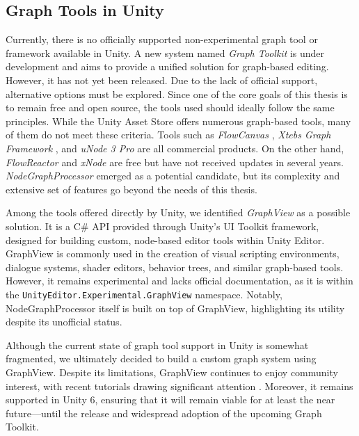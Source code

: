 \subsection{Graph Tools in Unity}
Currently, there is no officially supported non-experimental graph tool or framework available in Unity. A new system named \textit{Graph Toolkit}  \cite{Unity-GraphToolkit} is under development and aims to provide a unified solution for graph-based editing. However, it has not yet been released. Due to the lack of official support, alternative options must be explored. Since one of the core goals of this thesis is to remain free and open source, the tools used should ideally follow the same principles. While the Unity Asset Store offers numerous graph-based tools, many of them do not meet these criteria. Tools such as \textit{FlowCanvas} \cite{FlowCanvas}, \textit{Xtebs Graph Framework} \cite{XtebsGraphFramework}, and \textit{uNode 3 Pro} \cite{uNode3Pro} are all commercial products. On the other hand, \textit{FlowReactor} \cite{FlowReactor} and \textit{xNode} \cite{xNode} are free but have not received updates in several years. \textit{NodeGraphProcessor} \cite{NodeGraphProcessor} emerged as a potential candidate, but its complexity and extensive set of features go beyond the needs of this thesis.

Among the tools offered directly by Unity, we identified \textit{GraphView} \cite{Unity-GraphView} as a possible solution. It is a C\# API provided through Unity’s UI Toolkit framework, designed for building custom, node-based editor tools within Unity Editor. GraphView is commonly used in the creation of visual scripting environments, dialogue systems, shader editors, behavior trees, and similar graph-based tools. However, it remains experimental and lacks official documentation, as it is within the \verb|UnityEditor.Experimental.GraphView| namespace. Notably, NodeGraphProcessor itself is built on top of GraphView, highlighting its utility despite its unofficial status.

Although the current state of graph tool support in Unity is somewhat fragmented, we ultimately decided to build a custom graph system using GraphView. Despite its limitations, GraphView continues to enjoy community interest, with recent tutorials drawing significant attention \cite{NodeEditor-YT}. Moreover, it remains supported in Unity 6, ensuring that it will remain viable for at least the near future—until the release and widespread adoption of the upcoming Graph Toolkit.

